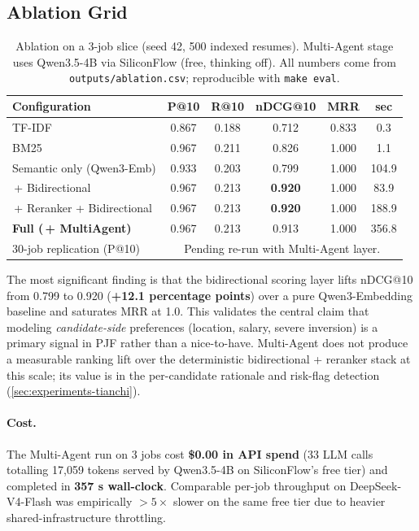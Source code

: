 \documentclass[11pt]{article}
\begin{document}
\subsection{Ablation Grid}

\begin{table}[t]
\centering\small
\caption{Ablation on a 3-job slice (seed 42, 500 indexed resumes).
Multi-Agent stage uses Qwen3.5-4B via SiliconFlow (free, thinking off).
All numbers come from \texttt{outputs/ablation.csv}; reproducible with
\texttt{make eval}.}
\label{tab:ablation}
\begin{tabular}{lccccc}
\toprule
Configuration & P@10 & R@10 & nDCG@10 & MRR & sec \\
\midrule
TF-IDF                            & 0.867 & 0.188 & 0.712 & 0.833 & 0.3 \\
BM25                              & 0.967 & 0.211 & 0.826 & 1.000 & 1.1 \\
Semantic only (Qwen3-Emb)         & 0.933 & 0.203 & 0.799 & 1.000 & 104.9 \\
\,+ Bidirectional                 & 0.967 & 0.213 & \textbf{0.920} & 1.000 & 83.9 \\
\,+ Reranker + Bidirectional      & 0.967 & 0.213 & \textbf{0.920} & 1.000 & 188.9 \\
\textbf{Full (\,+ MultiAgent)}    & 0.967 & 0.213 & 0.913 & 1.000 & 356.8 \\
\midrule
30-job replication (P@10) & \multicolumn{5}{c}{Pending re-run with Multi-Agent layer.} \\
\bottomrule
\end{tabular}
\end{table}

The most significant finding is that the
bidirectional scoring layer lifts nDCG@10 from 0.799 to 0.920
(\textbf{+12.1 percentage points}) over a pure Qwen3-Embedding baseline
and saturates MRR at 1.0. This validates the central claim that
modeling \emph{candidate-side} preferences (location, salary, severe
inversion) is a primary signal in PJF rather than a nice-to-have.
Multi-Agent does not produce a measurable ranking lift over the
deterministic bidirectional + reranker stack at this scale; its value
is in the per-candidate rationale and risk-flag detection
(\cref{sec:experiments-tianchi}).

\paragraph{Cost.} The Multi-Agent run on 3 jobs cost
\textbf{\$0.00 in API spend} (33 LLM calls totalling 17{,}059 tokens
served by Qwen3.5-4B on SiliconFlow's free tier) and completed in
\textbf{357 s wall-clock}. Comparable per-job throughput on DeepSeek-V4-Flash
was empirically ${>}5{\times}$ slower on the same free tier due to
heavier shared-infrastructure throttling.
\end{document}
